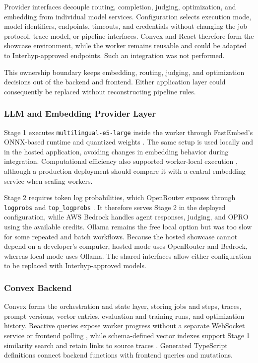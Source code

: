 Provider interfaces decouple routing, completion, judging, optimization, and embedding from individual model services. Configuration selects execution mode, model identifiers, endpoints, timeouts, and credentials without changing the job protocol, trace model, or pipeline interfaces. Convex and React therefore form the showcase environment, while the worker remains reusable and could be adapted to Interhyp-approved endpoints. Such an integration was not performed.

This ownership boundary keeps embedding, routing, judging, and optimization decisions out of the backend and frontend. Either application layer could consequently be replaced without reconstructing pipeline rules.

\subsubsection{LLM and Embedding Provider Layer}\label{sec:provider-layer}

Stage 1 executes \texttt{multilingual-e5-large} inside the worker through FastEmbed's ONNX-based runtime and quantized weights \autocite{fastembed-docs}. The same setup is used locally and in the hosted application, avoiding changes in embedding behavior during integration. Computational efficiency also supported worker-local execution \autocite{schwartz-green-ai}, although a production deployment should compare it with a central embedding service when scaling workers.

Stage 2 requires token log probabilities, which OpenRouter exposes through \texttt{logprobs} and \texttt{top\_logprobs} \autocite{openrouter-parameters}. It therefore serves Stage 2 in the deployed configuration, while AWS Bedrock handles agent responses, judging, and OPRO using the available credits. Ollama remains the free local option but was too slow for some repeated and batch workflows. Because the hosted showcase cannot depend on a developer's computer, hosted mode uses OpenRouter and Bedrock, whereas local mode uses Ollama. The shared interfaces allow either configuration to be replaced with Interhyp-approved models.

\subsubsection{Convex Backend}\label{sec:convex-backend}

Convex forms the orchestration and state layer, storing jobs and steps, traces, prompt versions, vector entries, evaluation and training runs, and optimization history. Reactive queries expose worker progress without a separate WebSocket service or frontend polling \autocite{convex-realtime}, while schema-defined vector indexes support Stage 1 similarity search and retain links to source traces \autocite{convex-vector-search}. Generated TypeScript definitions connect backend functions with frontend queries and mutations.

